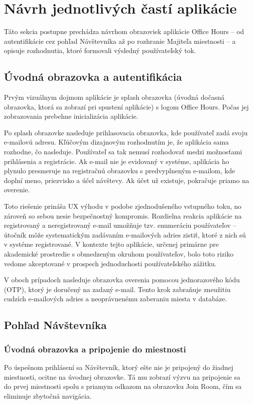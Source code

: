 \section{Návrh jednotlivých častí aplikácie}\label{sec:navrh-casti}
Táto sekcia postupne prechádza návrhom obrazoviek aplikácie Office Hours – od autentifikácie cez pohľad Návštevníka až po rozhranie Majiteľa miestnosti – a opisuje rozhodnutia, ktoré formovali výsledný používateľský tok.

\subsection{Úvodná obrazovka a autentifikácia}
Prvým vizuálnym dojmom aplikácie je splash obrazovka (úvodná dočasná obrazovka, ktorá sa zobrazí pri spustení aplikácie) s logom Office Hours. Počas jej zobrazovania prebehne inicializácia aplikácie.

Po splash obrazovke nasleduje prihlasovacia obrazovka, kde používateľ zadá svoju e-mailovú adresu. Kľúčovým dizajnovým rozhodnutím je, že aplikácia sama rozhodne, čo nasleduje. Používateľ sa tak nemusí rozhodovať medzi možnosťami prihlásenia a registrácie. Ak e-mail nie je evidovaný v systéme, aplikácia ho plynulo presmeruje na registračnú obrazovku s predvyplneným e-mailom, kde doplní meno, priezvisko a účel návštevy. Ak účet už existuje, pokračuje priamo na overenie.

Toto riešenie prináša UX výhodu v podobe zjednodušeného vstupného toku, no zároveň so sebou nesie bezpečnostný kompromis. Rozdielna reakcia aplikácie na registrovaný a neregistrovaný e-mail umožňuje tzv. enumeráciu používateľov – útočník môže systematickým zadávaním e-mailových adries zistiť, ktoré z nich sú v systéme registrované. V kontexte tejto aplikácie, určenej primárne pre akademické prostredie s obmedzeným okruhom používateľov, bolo toto riziko vedome akceptované v prospech jednoduchosti používateľského zážitku. 

V oboch prípadoch nasleduje obrazovka overenia pomocou jednorazového kódu (OTP), ktorý je doručený na zadaný e-mail. Tento krok zabraňuje zneužitiu cudzích e-mailových adries a neoprávnenému zaberaniu miesta v databáze.

\subsection{Pohľad Návštevníka}

\subsubsection*{Úvodná obrazovka a pripojenie do miestnosti}
Po úspešnom prihlásení sa Návštevník, ktorý ešte nie je pripojený do žiadnej miestnosti, ocitne na úvodnej obrazovke. Tá mu zobrazí výzvu na pripojenie sa do prvej miestnosti spolu s priamym odkazom na obrazovku Join Room, čím sa eliminuje zbytočná navigácia.

